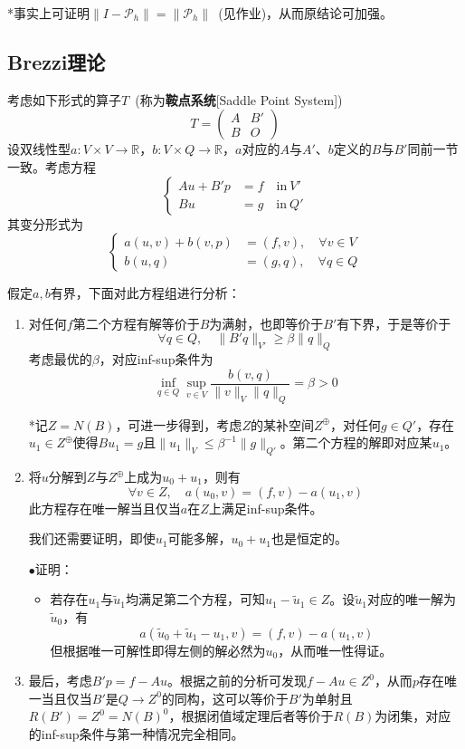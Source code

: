 \documentclass[a4paper,UTF8,fontset=windows]{ctexart}
\newcommand*{\cp}{\mathcal{P}}
\newcommand{\proo}[1]{{\kaishu $\bullet$证明：
\begin{itemize}
    \item[] #1
\end{itemize}
}}
\begin{document}
*事实上可证明$\|I-\cp_h\|=\|\cp_h\|$\ (见作业)，从而原结论可加强。

\subsection{Brezzi理论}

考虑如下形式的算子$T$\ (称为\textbf{鞍点系统}[Saddle Point System])
$$T=\begin{pmatrix}A&B'\\B&O\end{pmatrix}$$
设双线性型$a:V\times V\to\mathbb{R}$，$b:V\times Q\to\mathbb{R}$，$a$对应的$A$与$A'$、$b$定义的$B$与$B'$同前一节一致。考虑方程
$$\begin{cases}Au+B'p&=f\quad\text{in}\ V'\\Bu&=g\quad\text{in}\ Q'\end{cases}$$
其变分形式为
$$\begin{cases}a(u,v)+b(v,p)&=(f,v),\quad\forall v\in V\\b(u,q)&=(g,q),\quad\forall q\in Q\end{cases}$$

假定$a,b$有界，下面对此方程组进行分析：
\begin{enumerate}
    \item 对任何$f$第二个方程有解等价于$B$为满射，也即等价于$B'$有下界，于是等价于
    $$\forall q\in Q,\quad\|B'q\|_{V'}\ge\beta\|q\|_Q$$
    考虑最优的$\beta$，对应inf-sup条件为
    $$\inf_{q\in Q}\sup_{v\in V}\frac{b(v,q)}{\|v\|_V\|q\|_Q}=\beta>0$$
    
    *记$Z=N(B)$，可进一步得到，考虑$Z$的某补空间$Z^\oplus$，对任何$g\in Q'$，存在$u_1\in Z^\oplus$使得$Bu_1=g$且$\|u_1\|_V\le\beta^{-1}\|g\|_{Q'}$。第二个方程的解即对应某$u_1$。

    \item 将$u$分解到$Z$与$Z^\oplus$上成为$u_0+u_1$，则有
    $$\forall v\in Z,\quad a(u_0,v)=(f,v)-a(u_1,v)$$
    此方程存在唯一解当且仅当$a$在$Z$上满足inf-sup条件。
    
    我们还需要证明，即使$u_1$可能多解，$u_0+u_1$也是恒定的。
    
    \proo{
        若存在$u_1$与$\tilde{u}_1$均满足第二个方程，可知$u_1-\tilde{u}_1\in Z$。设$\tilde{u}_1$对应的唯一解为$\tilde{u}_0$，有
        $$a(\tilde{u}_0+\tilde{u}_1-u_1,v)=(f,v)-a(u_1,v)$$
        但根据唯一可解性即得左侧的解必然为$u_0$，从而唯一性得证。
    }

    \item 最后，考虑$B'p=f-Au$。根据之前的分析可发现$f-Au\in Z^0$，从而$p$存在唯一当且仅当$B'$是$Q\to Z^0$的同构，这可以等价于$B'$为单射且$R(B')=Z^0=N(B)^0$，根据闭值域定理后者等价于$R(B)$为闭集，对应的inf-sup条件与第一种情况完全相同。
\end{enumerate}
\end{document}

